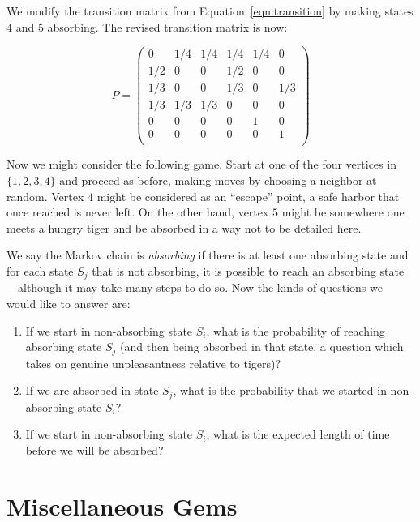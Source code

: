 \begin{example}
We modify the transition matrix from Equation~\ref{eqn:transition} by 
making states $4$ and $5$ absorbing.  The revised transition matrix is now:

\begin{equation}\label{eqn:absorbing}
P =\begin{pmatrix}
      0 & 1/4 & 1/4 & 1/4 & 1/4 &   0 \\
    1/2 &   0 &   0 & 1/2 &   0 &   0 \\
    1/3 &   0 &   0 & 1/3 &   0 & 1/3 \\
    1/3 & 1/3 & 1/3 &   0 &   0 &   0 \\
      0 &   0 &   0 &   0 &   1 &   0 \\
      0 &   0 &   0 &   0 &   0 &   1 \\
   \end{pmatrix}
\end{equation} 
\end{example}
Now we might consider the following game.  Start at one of the
four vertices in $\{1,2,3,4\}$ and proceed as before, making
moves by choosing a neighbor at random.  Vertex $4$ might
be considered as an ``escape'' point, a safe harbor that once
reached is never left.  On the other hand, vertex $5$ might
be somewhere one meets a hungry tiger and be absorbed in a
way not to be detailed here.

We say the Markov chain is \textit{absorbing} if there is at least one
absorbing state and for each state $S_j$ that is not absorbing, it is possible
to reach an absorbing state---although it may take many steps to do so.
Now the kinds of questions we would like to answer are:

\begin{enumerate}
\item If we start in non-absorbing state $S_i$, what is the probability
of reaching absorbing state $S_j$ (and then being absorbed in that state,
a question which takes on genuine unpleasantness relative to tigers)?
\item If we are absorbed in state $S_j$, what is the probability
that we started in non-absorbing state $S_i$? 
\item If we start in non-absorbing state $S_i$, what is the expected length of
time before we will be absorbed?
\end{enumerate}

\section{Miscellaneous Gems}\label{s:kitchensink:misc}

